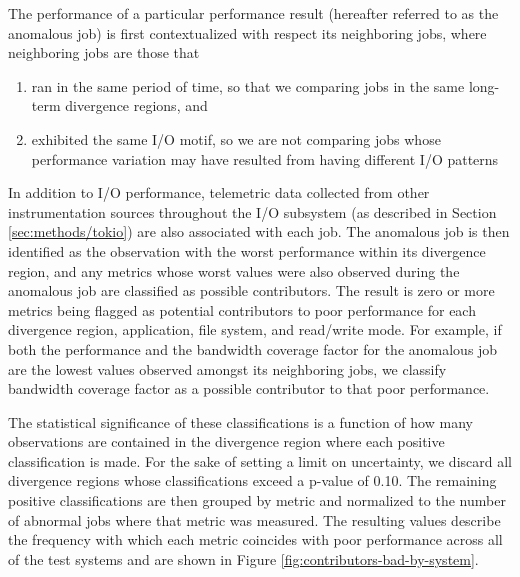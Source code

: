 The performance of a particular performance result (hereafter referred to as the anomalous job) is first contextualized with respect its neighboring jobs, where neighboring jobs are those that
\begin{enumerate}[leftmargin=*]
\item ran in the same period of time, so that we comparing jobs in the same long-term divergence regions, and
\item exhibited the same I/O motif, so we are not comparing jobs whose performance variation may have resulted from having different I/O patterns
\end{enumerate}

In addition to I/O performance, telemetric data collected from other instrumentation sources throughout the I/O subsystem (as described in Section \ref{sec:methods/tokio}) are also associated with each job.
The anomalous job is then identified as the observation with the worst performance within its divergence region, and any metrics whose worst values were also observed during the anomalous job are classified as possible contributors.
The result is zero or more metrics being flagged as potential contributors to poor performance for each divergence region, application, file system, and read/write mode. For example, if both the performance and the bandwidth coverage factor for the anomalous job are the lowest values observed amongst its neighboring jobs, we classify bandwidth coverage factor as a possible contributor to that poor performance.


The statistical significance of these classifications is a function of how many observations are contained in the divergence region where each positive classification is made.
For the sake of setting a limit on uncertainty, we discard all divergence regions whose classifications exceed a p-value of 0.10. 
The remaining positive classifications are then grouped by metric and normalized to the number of abnormal jobs where that metric was measured.
The resulting values describe the frequency with which each metric coincides with poor performance across all of the test systems and are shown in Figure \ref{fig:contributors-bad-by-system}.

